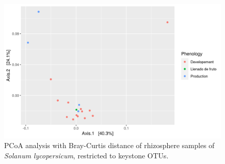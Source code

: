 \documentclass{article}
\begin{document}
\begin{figure}
    \centering
    \includegraphics[scale = 0.7]{tomate_clave_pcoa.png}
    \caption{PCoA analysis with Bray-Curtis distance of rhizosphere samples of \textit{Solanum lycopersicum}, restricted to keystone OTUs.}
    \label{fig:tomate_pcoa_key_otus}
\end{figure}
\end{document}
